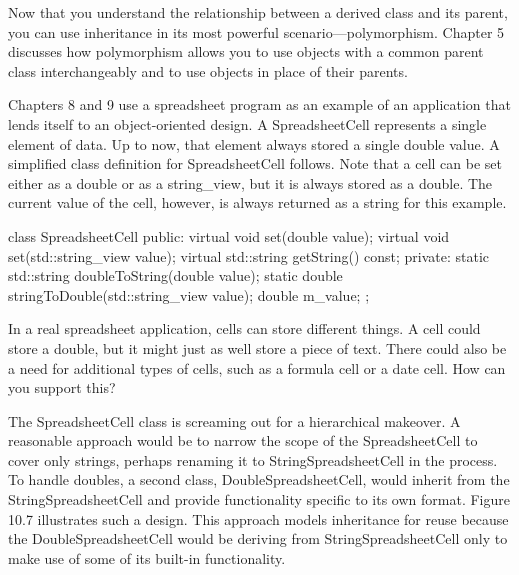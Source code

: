 
Now that you understand the relationship between a derived class and its parent, you can use inheritance in its most powerful scenario—polymorphism. Chapter 5 discusses how polymorphism allows you to use objects with a common parent class interchangeably and to use objects in place of their parents.


Chapters 8 and 9 use a spreadsheet program as an example of an application that lends itself to an object-oriented design. A SpreadsheetCell represents a single element of data. Up to now, that element always stored a single double value. A simplified class definition for SpreadsheetCell follows. Note that a cell can be set either as a double or as a string\_view, but it is always stored as a double. The current value of the cell, however, is always returned as a string for this example.

\begin{cpp}
class SpreadsheetCell
{
    public:
        virtual void set(double value);
        virtual void set(std::string_view value);
        virtual std::string getString() const;
    private:
        static std::string doubleToString(double value);
        static double stringToDouble(std::string_view value);
        double m_value;
};
\end{cpp}

In a real spreadsheet application, cells can store different things. A cell could store a double, but it might just as well store a piece of text. There could also be a need for additional types of cells, such as a formula cell or a date cell. How can you support this?


The SpreadsheetCell class is screaming out for a hierarchical makeover. A reasonable approach would be to narrow the scope of the SpreadsheetCell to cover only strings, perhaps renaming it to StringSpreadsheetCell in the process. To handle doubles, a second class, DoubleSpreadsheetCell, would inherit from the StringSpreadsheetCell and provide functionality specific to its own format. Figure 10.7 illustrates such a design. This approach models inheritance for reuse because the DoubleSpreadsheetCell would be deriving from StringSpreadsheetCell only to make use of some of its built-in functionality.


